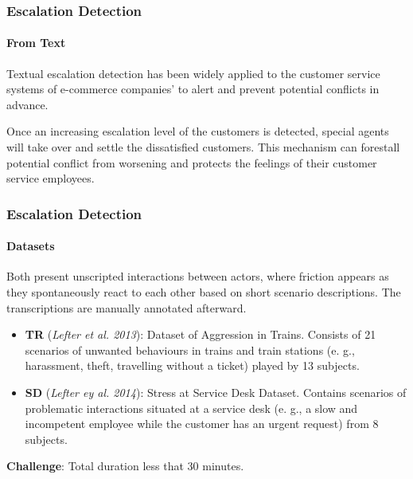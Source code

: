\documentclass[
	11pt, %
]{beamer}
\begin{document}

\begin{frame}
	\frametitle{Escalation Detection}
	\framesubtitle{From Text}
	
	
    \alert{Textual escalation detection} has been widely applied to the customer service systems of e-commerce companies’ to alert and prevent potential conflicts in advance. 
    \bigskip    
    
    Once an increasing escalation level of the customers is detected, special agents will take over and settle the dissatisfied customers. This mechanism can forestall potential conflict from worsening and protects the feelings of their customer service employees.

\end{frame}


\begin{frame}
	\frametitle{Escalation Detection}
	\framesubtitle{Datasets}
	Both present unscripted interactions between actors, where friction appears as they spontaneously react to each other based on short scenario descriptions. The transcriptions are manually annotated afterward.
	\begin{itemize}
	    \item \textbf{TR} (\emph{Lefter et al. 2013}): Dataset of Aggression in Trains. Consists of 21 scenarios of unwanted behaviours in trains and train stations (e. g., harassment, theft, travelling without a ticket) played by 13 subjects. 
	    \item \textbf{SD} (\emph{Lefter ey al. 2014}): Stress at Service Desk Dataset. Contains scenarios of problematic interactions situated at a service desk (e. g., a slow and incompetent employee while the customer has an urgent request) from 8 subjects.
	\end{itemize}
	\textbf{Challenge}: Total duration less that \alert{30} minutes.
\end{frame}

\end{document}
